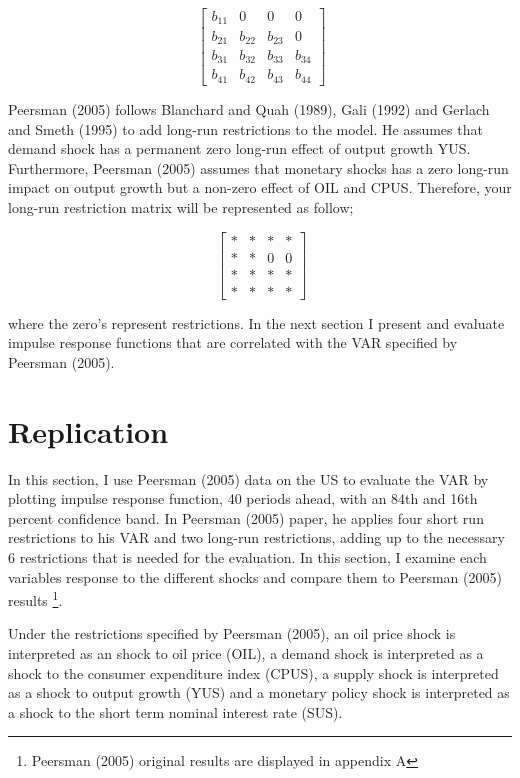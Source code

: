 \documentclass[11pt,preprint, authoryear]{elsarticle}
\numberwithin{equation}{section}
\numberwithin{figure}{section}
\numberwithin{table}{section}
\let\rmarkdownfootnote\footnote%
\def\footnote{\protect\rmarkdownfootnote}
\begin{document}
\[\ \begin{bmatrix} b_{11}& 0 & 0 & 0 \\
b_{21}& b_{22}& b_{23} & 0 \\
b_{31}& b_{32}& b_{33} & b_{34} \\
b_{41}& b_{42}& b_{43} & b_{44} \end{bmatrix} \]

Peersman (2005) follows Blanchard and Quah (1989), Gali (1992) and
Gerlach and Smeth (1995) to add long-run restrictions to the model. He
assumes that demand shock has a permanent zero long-run effect of output
growth YUS. Furthermore, Peersman (2005) assumes that monetary shocks
has a zero long-run impact on output growth but a non-zero effect of OIL
and CPUS. Therefore, your long-run restriction matrix will be
represented as follow;

\[\ \begin{bmatrix} *& *& *& * \\
*& *& 0 & 0 \\
*& *& *& * \\
*& *& * & * \end{bmatrix} \]

where the zero's represent restrictions. In the next section I present
and evaluate impulse response functions that are correlated with the VAR
specified by Peersman (2005).

\hypertarget{replication}{%
\section{Replication}\label{replication}}

In this section, I use Peersman (2005) data on the US to evaluate the
VAR by plotting impulse response function, 40 periods ahead, with an
84th and 16th percent confidence band. In Peersman (2005) paper, he
applies four short run restrictions to his VAR and two long-run
restrictions, adding up to the necessary 6 restrictions that is needed
for the evaluation. In this section, I examine each variables response
to the different shocks and compare them to Peersman (2005) results
\footnote{Peersman (2005) original results are displayed in appendix A}.

Under the restrictions specified by Peersman (2005), an oil price shock
is interpreted as an shock to oil price (OIL), a demand shock is
interpreted as a shock to the consumer expenditure index (CPUS), a
supply shock is interpreted as a shock to output growth (YUS) and a
monetary policy shock is interpreted as a shock to the short term
nominal interest rate (SUS).
\end{document}
